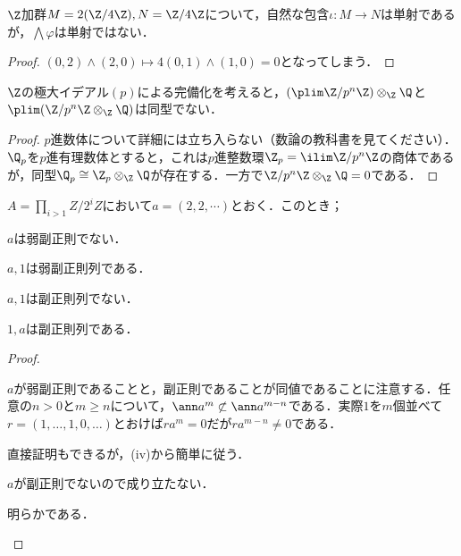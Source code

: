 \begin{surex}\label{ex:単射の外積が単射でない例}
	$\Z$加群$M=2(\Z/4\Z), N=\Z/4\Z$について，自然な包含$\iota:M\to N$は単射であるが，$\bigwedge\varphi$は単射ではない．
\end{surex}

\begin{proof}
	$(0,2)\wedge(2,0)\mapsto 4(0,1)\wedge(1,0)=0$となってしまう．
\end{proof}

\begin{surex}\label{ex:射影極限とテンソル積が可換でない例}
	$\Z$の極大イデアル$(p)$による完備化を考えると，$(\plim \Z/p^n\Z)\otimes_\Z\Q$と$\plim(\Z/p^n\Z\otimes_\Z\Q)$は同型でない．
\end{surex}

\begin{proof}
	$p$進数体について詳細には立ち入らない（数論の教科書を見てください）．$\Q_p$を$p$進有理数体とすると，これは$p$進整数環$\Z_p=\ilim \Z/p^n\Z$の商体であるが，同型$\Q_p\cong\Z_p\otimes_\Z \Q$が存在する．一方で$\Z/p^n\Z\otimes_\Z\Q=0$である．
\end{proof}

\begin{surex}
	$A=\prod_{i>1}Z/2^iZ$において$a=(2,2,\cdots)$とおく．このとき；
	\begin{sakura}
		\item $a$は弱副正則でない．
		\item $a,1$は弱副正則列である．
		\item $a,1$は副正則列でない．
		\item $1,a$は副正則列である．
	\end{sakura}
\end{surex}

\begin{proof}
	\begin{sakura}
		\item $a$が弱副正則であることと，副正則であることが同値であることに注意する．任意の$n>0$と$m\geq n$について，$\ann a^m\not\subset\ann a^{m-n}$である．実際$1$を$m$個並べて$r=(1,\dots,1,0,\dots)$とおけば$ra^m=0$だが$ra^{m-n}\neq 0$である．
		\item 直接証明もできるが，(iv)から簡単に従う．
		\item $a$が副正則でないので成り立たない．
		\item 明らかである．
	\end{sakura}
\end{proof}